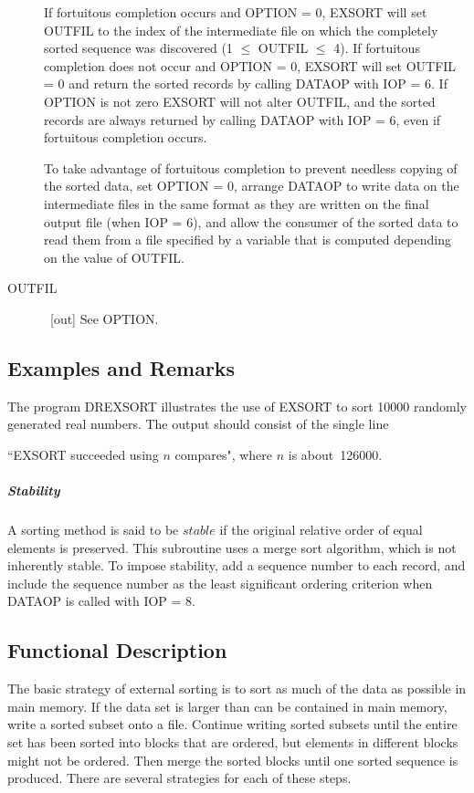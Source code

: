 \documentclass[twoside]{MATH77}
\begin{document}
\begin{description}
If fortuitous completion occurs and OPTION = 0, EXSORT will set OUTFIL to
the index of the intermediate file on which the completely sorted sequence
was discovered (1 $\leq $ OUTFIL $\leq $ 4). If fortuitous
completion does not occur and OPTION = 0, EXSORT will set OUTFIL = 0 and
return the sorted records by calling DATAOP with IOP = 6. If OPTION is not
zero EXSORT will not alter OUTFIL, and the sorted records are always
returned by calling DATAOP with IOP = 6, even if fortuitous completion
occurs.

To take advantage of fortuitous completion to prevent needless copying of
the sorted data, set OPTION = 0, arrange DATAOP to write data on the
intermediate files in the same format as they are written on the final
output file (when IOP = 6), and allow the consumer of the sorted data to
read them from a file specified by a variable that is computed depending on
the value of OUTFIL.

\item[OUTFIL] \ [out] See OPTION.

\end{description}

\subsection{Examples and Remarks}

The program DREXSORT illustrates the use of EXSORT to sort 10000 randomly
generated real numbers. The output should consist of the single line

``EXSORT succeeded using $n$ compares", where $n$ is about~126000.

\subparagraph{Stability}

A sorting method is said to be $stable$ if the original relative order of
equal elements is preserved.  This subroutine uses a merge sort algorithm,
which is not inherently
stable. To impose stability, add a sequence number to each record, and
include the sequence number as the least significant ordering criterion when
DATAOP is called with IOP = 8.

\subsection{Functional Description}

The basic strategy of external sorting is to sort as much of the data as
possible in main memory. If the data set is larger than can be contained in
main memory, write a sorted subset onto a file. Continue writing sorted
subsets until the entire set has been sorted into blocks that are ordered,
but elements in different blocks might not be ordered. Then merge the sorted
blocks until one sorted sequence is produced. There are several strategies
for each of these steps.
\end{document}
